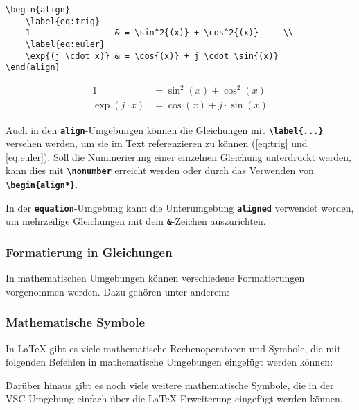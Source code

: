 \begin{lstlisting}
\begin{align}
    \label{eq:trig}
    1                 & = \sin^2{(x)} + \cos^2{(x)}     \\
    \label{eq:euler}
    \exp{(j \cdot x)} & = \cos{(x)} + j \cdot \sin{(x)}
\end{align}
\end{lstlisting}

\begin{align}
    \label{eq:trig}
    1                 & = \sin^2{(x)} + \cos^2{(x)}     \\
    \label{eq:euler}
    \exp{(j \cdot x)} & = \cos{(x)} + j \cdot \sin{(x)}
\end{align}

Auch in den \textbf{\texttt{align}}-Umgebungen können die Gleichungen mit \textbf{\texttt{\textbackslash label\{...\}}} versehen werden, um sie im Text referenzieren zu können (\autoref{eq:trig} und \autoref{eq:euler}). Soll die Nummerierung einer einzelnen Gleichung unterdrückt werden, kann dies mit \textbf{\texttt{\textbackslash nonumber}} erreicht werden oder durch das Verwenden von \textbf{\texttt{\textbackslash begin\{align*\}}}.

In der \textbf{\texttt{equation}}-Umgebung kann die Unterumgebung \textbf{\texttt{aligned}} verwendet werden, um mehrzeilige Gleichungen mit dem \textbf{\texttt{\&}}-Zeichen auszurichten.

\subsubsection{Formatierung in Gleichungen}
In mathematischen Umgebungen können verschiedene Formatierungen vorgenommen werden. Dazu gehören unter anderem:




\subsubsection{Mathematische Symbole}
In \LaTeX{} gibt es viele mathematische Rechenoperatoren und Symbole, die mit folgenden Befehlen in mathematische Umgebungen eingefügt werden können:



Darüber hinaus gibt es noch viele weitere mathematische Symbole, die in der VSC-Umgebung einfach über die \LaTeX{}-Erweiterung eingefügt werden können.


